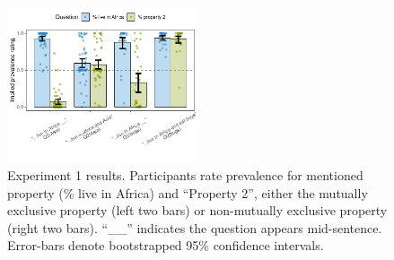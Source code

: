\documentclass[10pt,letterpaper]{article}
\newcommand{\red}[1]{{\textcolor{Red}{#1}}}
\begin{document}
%
%
%




\begin{figure}[h]
  \centering
    \includegraphics[width=0.5\textwidth]{expt2_summary}
  \caption{Experiment 1 results.  Participants rate prevalence for mentioned property (\% live in Africa) and ``Property 2'', either the mutually exclusive property (left two bars) or non-mutually exclusive property (right two bars). ``\_\_'' indicates the question appears mid-sentence. Error-bars denote bootstrapped 95\% confidence intervals.}
  \label{fig:expt2}
  \end{figure}
\end{document}
